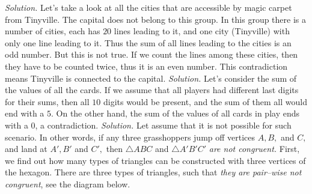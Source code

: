 \begin{multicols}{2}
	\vskip 0.2cm
	\textit{Solution.} Let's take a look at all the cities that are accessible by magic carpet from Tinyville. The capital does not belong to this group. In this group there is a number of cities, each has $20$ lines leading to it,
		and one city (Tinyville) with only one line leading to it. Thus the sum of all lines leading to the cities is an odd number.
		But this is not true. If we count the lines among these cities, then they have to be counted twice, thus it is an even number.
		This contradiction means Tinyville is connected to the capital.
	\vskip 0.2cm
	\vskip 0.2cm
	\textit{Solution.}
	Let's consider the sum of the values of all the cards.
	If we assume that all players had different last digits for their sums, then all $10$ digits would be present, and the sum of them all would end with a $5$.
	On the other hand, the sum of the values of all cards in play ends with a $0$, a contradiction.
	\vskip 0.2cm
	\vskip 0.2cm
	\textit{Solution.}
		Let assume that it is not possible for such scenario. In other words, if any three grasshoppers jump off vertices $A, B,$ and $C,$
		and land at $A', B'$ and $C',$ then $\triangle ABC$ and $\triangle A'B'C'$ \textit{are not congruent.}
		\vskip 0.1cm
		First, we find out how many types of triangles can be constructed with three vertices of the hexagon.
		There are three types of triangles, such that \textit{they are pair--wise not congruent}, see the diagram below.

\end{multicols}
